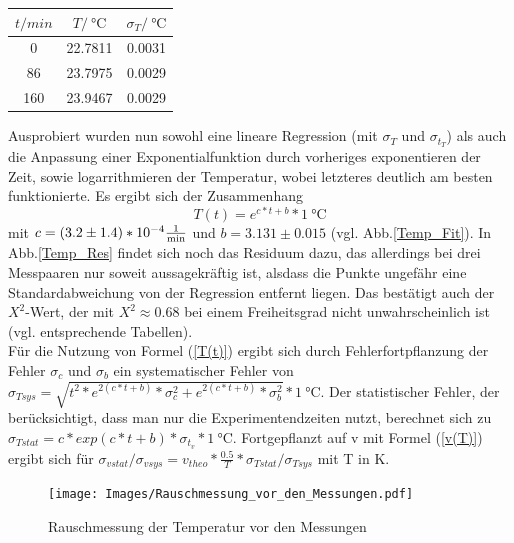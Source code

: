 \documentclass[]{article}
\begin{document}
 	\begin{center}
 	\begin{tabular}{c|c|c}
 		$t/min$ & $T/\SI{}{\celsius}$ & $\sigma_T/\SI{}{\celsius}$\\
 		\hline
 		0 & 22.7811 & 0.0031\\
 		\hline 
 		86 & 23.7975 & 0.0029\\
 		\hline
 		160 & 23.9467 & 0.0029\\
 	\end{tabular}
 	\end{center}
 	
 	Ausprobiert wurden nun sowohl eine lineare Regression (mit $\sigma_T$ und $\sigma_{t_T}$) als auch die Anpassung einer Exponentialfunktion durch vorheriges exponentieren der Zeit, sowie logarrithmieren der Temperatur, wobei letzteres deutlich am besten funktionierte. Es ergibt sich der Zusammenhang
 	\begin{equation}
 	T(t)=e^{c*t+b} *\SI{1}{\celsius}
 	\label{T(t)}
 	\end{equation}
	mit $c=(3.2\pm1.4)*10^{-4}\SI{}{\frac{1}{\minute}}$ und $b=3.131\pm0.015$ (vgl. Abb.\ref{Temp_Fit}).
	In Abb.\ref{Temp_Res} findet sich noch das Residuum dazu, das allerdings bei drei Messpaaren nur soweit aussagekräftig ist, alsdass die Punkte ungefähr eine Standardabweichung von der Regression entfernt liegen. Das bestätigt auch der $X^2$-Wert, der mit $X^2\approx0.68$ bei einem Freiheitsgrad nicht unwahrscheinlich ist (vgl. entsprechende Tabellen).\\
	Für die Nutzung von Formel (\ref{T(t)}) ergibt sich durch Fehlerfortpflanzung der Fehler $\sigma_c$ und $\sigma_b$ ein systematischer Fehler von $\sigma_{Tsys}=\sqrt{t^2*e^{2(c*t+b)}*\sigma_c^2+e^{2(c*t+b)}*\sigma_b^2}*\SI{1}{\celsius}$. Der statistischer Fehler, der berücksichtigt, dass man nur die Experimentendzeiten nutzt, berechnet sich zu $\sigma_{Tstat}=c*exp{(c*t+b)}*\sigma_{t_v}*\SI{1}{\celsius}$. Fortgepflanzt auf v mit Formel (\ref{v(T)}) ergibt sich für $\sigma_{vstat}/\sigma_{vsys}=v_{theo}*\frac{0.5}{T}*\sigma_{Tstat}/\sigma_{Tsys}$ mit T in K.\\
	
	\begin{figure}
	\begin{center}
		\texttt{[image: Images/Rauschmessung\_vor\_den\_Messungen.pdf]}
		\caption{Rauschmessung der Temperatur vor den Messungen}
		\label{Temp_vorn}
	\end{center}
	\end{figure}	
\end{document}
